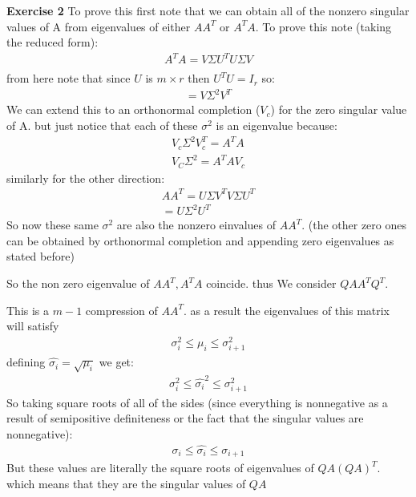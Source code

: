 \documentclass[12pt]{article}
\newenvironment{exercise}[1]{\vspace{.1in}\noindent\textbf{Exercise #1 \hspace{.05em}}}{}
\theoremstyle{definition}
\theoremstyle{remark}
\begin{document}
\begin{exercise}{2}
	To prove this first note that we can obtain all of the nonzero singular values of A from eigenvalues of either $AA^T$ or $A^TA$. To prove this note (taking the reduced form):
	\begin{align}
		A^TA=V\Sigma U^TU\Sigma V \\
	\end{align}
	from here note that since $U$ is $m\times r$ then $U^TU=I_r$ so:
	\begin{align}
		= V\Sigma^2V^T
	\end{align}
	We can extend this to an orthonormal completion ($V_c$) for the zero singular value of A. but just notice that each of these $\sigma^2$ is an eigenvalue because:
	\begin{align}
		V_c\Sigma^2V_c^T=A^TA \\
		V_C\Sigma^2=A^TAV_c
	\end{align}
	similarly for the other direction:
	\begin{align}
		AA^T=U\Sigma V^TV\Sigma U^T \\
		=U\Sigma^2U^T
	\end{align}
	So now these same $\sigma^2$ are also the nonzero einvalues of $AA^T$. (the other zero ones can be obtained by orthonormal completion and appending zero eigenvalues as stated before)

	So the non zero eigenvalue of $AA^T,A^TA$ coincide. thus We consider $QAA^TQ^T$.

	This is a $m-1$ compression of $AA^T$. as a result the eigenvalues of this matrix will satisfy
	\begin{align}
		\sigma^2_i\leq \mu_i\leq \sigma^2_{i+1}
	\end{align}
	defining $\hat{\sigma_i}=\sqrt{\mu_i}$ we get:
	\begin{align}
		\sigma_i^2\leq \hat{\sigma_i}^2\leq \sigma_{i+1}^2
	\end{align}
	So taking square roots of all of the sides (since everything is nonnegative as a result of semipositive definiteness or the fact that the singular values are nonnegative):
	\begin{align}
		\sigma_i\leq \hat{\sigma_i}\leq \sigma_{i+1}
	\end{align}
	But these values are literally the square roots  of eigenvalues of $QA(QA)^T$. which  means that they are the singular values of $QA$
\end{exercise}
\end{document}
